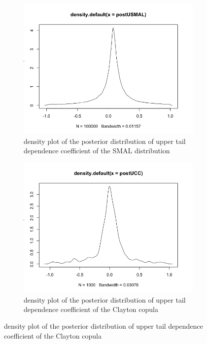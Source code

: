 \documentclass[mstat,12pt]{unswthesis}  %
\numberwithin{equation}{section}
\begin{document}
\begin{figure}[h]
\begin{subfigure}{.42\textwidth}
  \centering
  \includegraphics[width=\linewidth]{postUSMAL.png}  
  \caption{density plot of the posterior distribution of upper tail dependence coefficient of the SMAL distribution}
  \label{fig:sub-first}
\end{subfigure}
\begin{subfigure}{.42\textwidth}
  \centering
  \includegraphics[width=\linewidth]{postUCC2.png}  
  \caption{density plot of the posterior distribution of upper tail dependence coefficient of the Clayton copula}
  \label{fig:sub-second}
\end{subfigure}


\end{figure}
\end{document}
